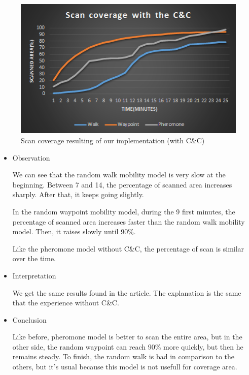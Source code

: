 \begin{figure}[!hbtf]
\centering
   \includegraphics{../images/ScanCoverageResultCandC.png}
\caption{\label{scancoverage} Scan coverage resulting of our implementation (with C\&C)}
\end{figure}

\begin{itemize}

\item Observation

We can see that the random walk mobility model is very slow at the beginning. Between 7 and 14, the percentage of scanned area increases sharply. After that, it keeps going slightly.

In the random waypoint mobility model, during the 9 first minutes, the percentage of scanned area increases faster than the random walk mobility model. Then, it raises slowly until 90\%.

Like the pheromone model without C\&C, the percentage of scan is similar over the time.
 
\item Interpretation

We get the same results found in the article. The explanation is the same that the experience without C\&C.

\item Conclusion

Like before, pheromone model is better to scan the entire area, but in the other side, the random waypoint can reach 90\% more quickly, but then he remains steady.
To finish, the random walk is bad in comparison to the others, but it's usual because this model is not usefull for coverage area.
\end{itemize}